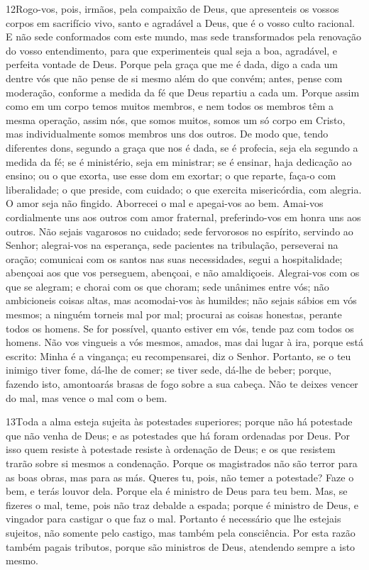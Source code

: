\lettrine{12} Rogo-vos, pois, irmãos, pela compaixão de Deus,
que apresenteis os vossos corpos em sacrifício vivo, santo e
agradável a Deus, que é o vosso culto racional. E não sede
conformados com este mundo, mas sede transformados pela renovação do
vosso entendimento, para que experimenteis qual seja a boa,
agradável, e perfeita vontade de Deus. Porque pela graça que me
é dada, digo a cada um dentre vós que não pense de si mesmo além do
que convém; antes, pense com moderação, conforme a medida da fé que
Deus repartiu a cada um. Porque assim como em um corpo temos
muitos membros, e nem todos os membros têm a mesma operação,
assim nós, que somos muitos, somos um só corpo em Cristo, mas
individualmente somos membros uns dos outros. De modo que, tendo
diferentes dons, segundo a graça que nos é dada, se é profecia, seja
ela segundo a medida da fé; se é ministério, seja em ministrar;
se é ensinar, haja dedicação ao ensino; ou o que exorta, use
esse dom em exortar; o que reparte, faça-o com liberalidade; o que
preside, com cuidado; o que exercita misericórdia, com alegria.
O amor seja não fingido. Aborrecei o mal e apegai-vos ao bem.
Amai-vos cordialmente uns aos outros com amor fraternal,
preferindo-vos em honra uns aos outros. Não sejais vagarosos
no cuidado; sede fervorosos no espírito, servindo ao Senhor;
alegrai-vos na esperança, sede pacientes na tribulação,
perseverai na oração; comunicai com os santos nas suas
necessidades, segui a hospitalidade; abençoai aos que vos
perseguem, abençoai, e não amaldiçoeis. Alegrai-vos com os
que se alegram; e chorai com os que choram; sede unânimes
entre vós; não ambicioneis coisas altas, mas acomodai-vos às
humildes; não sejais sábios em vós mesmos; a ninguém torneis
mal por mal; procurai as coisas honestas, perante todos os homens.
Se for possível, quanto estiver em vós, tende paz com todos
os homens. Não vos vingueis a vós mesmos, amados, mas dai
lugar à ira, porque está escrito: Minha é a vingança; eu
recompensarei, diz o Senhor. Portanto, se o teu inimigo tiver
fome, dá-lhe de comer; se tiver sede, dá-lhe de beber; porque,
fazendo isto, amontoarás brasas de fogo sobre a sua cabeça.
Não te deixes vencer do mal, mas vence o mal com o bem.

\medskip

\lettrine{13} Toda a alma esteja sujeita às potestades
superiores; porque não há potestade que não venha de Deus; e as
potestades que há foram ordenadas por Deus. Por isso quem
resiste à potestade resiste à ordenação de Deus; e os que resistem
trarão sobre si mesmos a condenação. Porque os magistrados não
são terror para as boas obras, mas para as más. Queres tu, pois, não
temer a potestade? Faze o bem, e terás louvor dela. Porque ela é
ministro de Deus para teu bem. Mas, se fizeres o mal, teme, pois não
traz debalde a espada; porque é ministro de Deus, e vingador para
castigar o que faz o mal. Portanto é necessário que lhe estejais
sujeitos, não somente pelo castigo, mas também pela consciência.
Por esta razão também pagais tributos, porque são ministros de
Deus, atendendo sempre a isto mesmo.


